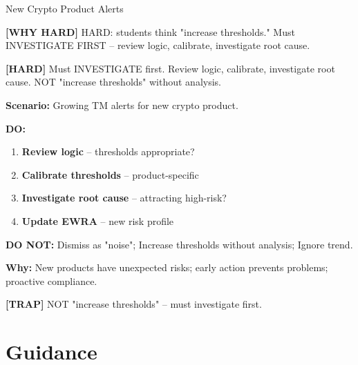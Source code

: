 \documentclass[6pt,aspectratio=169,fontsize=5pt]{beamer}
\renewcommand{\tiny}{\fontsize{3.5pt}{4.5pt}\selectfont}
\renewcommand{\normalsize}{\fontsize{7.5pt}{8.5pt}\selectfont}
\newcommand{\trap}[1]{%
	\begin{block}{\textcolor{redtrap}{\textbf{[TRAP]}}}
		\textcolor{redtrap}{\tiny #1}
	\end{block}
}
\newcommand{\hard}[1]{%
	\begin{block}{\textcolor{hardcolor}{\textbf{[HARD]}}}
		\textcolor{hardcolor}{\tiny #1}
	\end{block}
}
\newcommand{\hardexplain}[1]{%
	\begin{block}{\textcolor{orangehard}{\textbf{[WHY HARD]}}}
		\textcolor{orangehard}{\tiny #1}
	\end{block}
}
\begin{document}
	\begin{frame}{\normalsize New Crypto Product Alerts}
		
		\hardexplain{HARD: students think "increase thresholds." Must INVESTIGATE FIRST -- review logic, calibrate, investigate root cause.}
		
		\hard{Must INVESTIGATE first. Review logic, calibrate, investigate root cause. NOT "increase thresholds" without analysis.}
		
		\textbf{Scenario:} Growing TM alerts for new crypto product.
		
		\textbf{DO:}
		\begin{enumerate}
			\item \textbf{Review logic} -- thresholds appropriate?
			\item \textbf{Calibrate thresholds} -- product-specific
			\item \textbf{Investigate root cause} -- attracting high-risk?
			\item \textbf{Update EWRA} -- new risk profile
		\end{enumerate}
		
		\textbf{DO NOT:} Dismiss as "noise"; Increase thresholds without analysis; Ignore trend.
		
		\textbf{Why:} New products have unexpected risks; early action prevents problems; proactive compliance.
		
		\trap{NOT "increase thresholds" -- must investigate first.}
	\end{frame}
	
	\section{Guidance}
	
\end{document}
